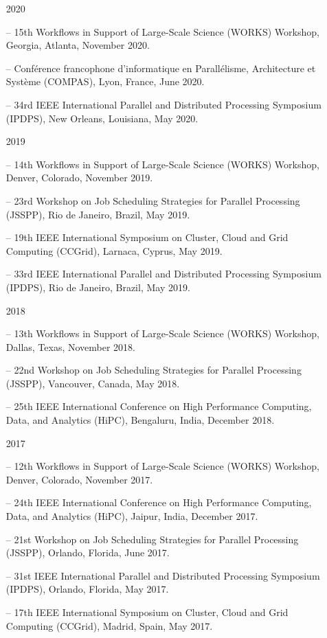 \documentclass[times,11pt]{letter}
\begin{document}
\begin{itemize}
\item [2020]
\item[--]  15th Workflows in Support of Large-Scale Science (WORKS) Workshop, Georgia, Atlanta, November 2020.
\item [--] Conf\'erence francophone d'informatique en Parall\'elisme, Architecture et Syst\`eme (COMPAS), Lyon, France, June 2020.
\item [--] 34rd IEEE International Parallel and Distributed Processing Symposium (IPDPS), New Orleans, Louisiana, May 2020.

\item [2019]
\item[--]  14th Workflows in Support of Large-Scale Science (WORKS) Workshop, Denver, Colorado, November 2019.
\item[--]  23rd Workshop on Job Scheduling Strategies for Parallel Processing (JSSPP), Rio de Janeiro, Brazil, May 2019.
\item[--]  19th IEEE International Symposium on Cluster, Cloud and Grid Computing (CCGrid), Larnaca, Cyprus, May 2019.
\item[--]  33rd IEEE International Parallel and Distributed Processing Symposium (IPDPS), Rio de Janeiro, Brazil, May 2019.

\item [2018]
\item[--]  13th Workflows in Support of Large-Scale Science (WORKS) Workshop, Dallas, Texas, November 2018.
\item[--]  22nd Workshop on Job Scheduling Strategies for Parallel Processing (JSSPP), Vancouver, Canada, May 2018.
\item[--]  25th IEEE International Conference on High Performance Computing, Data, and Analytics (HiPC), Bengaluru, India, December 2018.

\item [2017]
\item[--]  12th Workflows in Support of Large-Scale Science (WORKS) Workshop, Denver, Colorado, November 2017.
\item[--]  24th IEEE International Conference on High Performance Computing, Data, and Analytics (HiPC), Jaipur, India, December 2017.
\item[--]  21st Workshop on Job Scheduling Strategies for Parallel Processing (JSSPP), Orlando, Florida, June 2017.
\item[--]  31st IEEE International Parallel and Distributed Processing Symposium (IPDPS), Orlando, Florida, May 2017.
\item[--]  17th IEEE International Symposium on Cluster, Cloud and Grid Computing (CCGrid), Madrid, Spain, May 2017.


\end{itemize}
\end{document}
